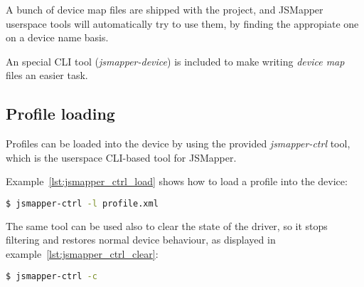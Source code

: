 A bunch of device map files are shipped with the project, and JSMapper userspace tools will automatically try to use them, by finding the appropiate one on a device name basis. 

An special CLI tool (\emph{jsmapper-device}) is included to make writing \emph{device map} files an easier task. 


\subsection{Profile loading}
Profiles can be loaded into the device by using the provided \emph{jsmapper-ctrl} tool, which is the userspace CLI-based tool for JSMapper. 

Example~\ref{lst:jsmapper_ctrl_load} shows how to load a profile into the device:
\begin{lstlisting}[language=bash,caption={Loading a profile},label={lst:jsmapper_ctrl_load}]
$ jsmapper-ctrl -l profile.xml 
\end{lstlisting}

The same tool can be used also to clear the state of the driver, so it stops filtering and restores normal device behaviour, as displayed in example~\ref{lst:jsmapper_ctrl_clear}:
\begin{lstlisting}[language=bash,caption={Clearing device},label={lst:jsmapper_ctrl_clear}]
$ jsmapper-ctrl -c 
\end{lstlisting}

